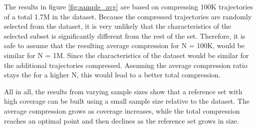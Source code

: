 The results in figure \ref{fig:sample_avg} are based on compressing 100K trajectories of a total 1.7M in the dataset. Because the compressed trajectories are randomly selected from the dataset, it is very unlikely that the characteristics of the selected subset is significantly different from the rest of the set. Therefore, it is safe to assume that the resulting average compression for N = 100K, would be similar for N = 1M. Since the characteristics of the dataset would be similar for the additional trajectories compressed. Assuming the average compression ratio stays the for a higher N, this would lead to a better total compression.

All in all, the results from varying sample sizes show that a reference set with high coverage can be built using a small sample size relative to the dataset. The average compression grows as coverage increases, while the total compression reaches an optimal point and then declines as the reference set grows in size.